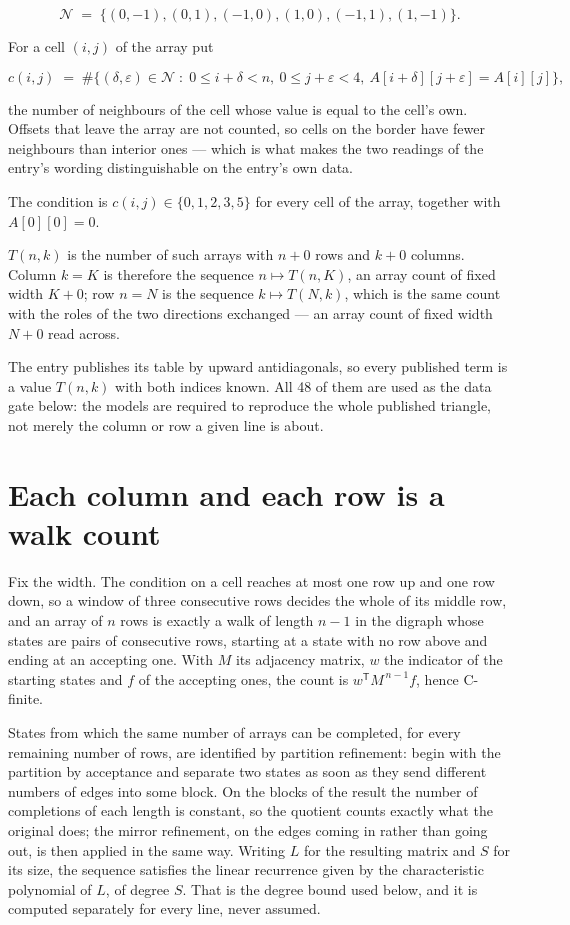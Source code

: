 \documentclass[11pt]{article}
\theoremstyle{definition}
\begin{document}
\[\mathcal{N} \;=\; \{(0,-1), (0,1), (-1,0), (1,0), (-1,1), (1,-1)\}.\]

For a cell $(i,j)$ of the array put

\[c(i,j) \;=\; \#\bigl\{(\delta,\varepsilon)\in\mathcal{N} \;:\; 0\le i+\delta<n,\ 0\le j+\varepsilon<4,\ A[i+\delta][j+\varepsilon] = A[i][j]\bigr\},\]

the number of neighbours of the cell whose value is equal to the cell's own. Offsets that leave the array are not counted, so cells on the border have fewer neighbours than interior ones --- which is what makes the two readings of the entry's wording distinguishable on the entry's own data.

The condition is $c(i,j) \in \{0, 1, 2, 3, 5\}$ for every cell of the array, together with $A[0][0]=0$.

$T(n,k)$ is the number of such arrays with $n + 0$ rows and $k + 0$ columns. Column $k = K$ is therefore the sequence $n \mapsto T(n,K)$, an array count of fixed width $K + 0$; row $n = N$ is the sequence $k \mapsto T(N,k)$, which is the same count with the roles of the two directions exchanged --- an array count of fixed width $N + 0$ read across.

The entry publishes its table by upward antidiagonals, so every published term is a value $T(n,k)$ with both indices known. All 48 of them are used as the data gate below: the models are required to reproduce the whole published triangle, not merely the column or row a given line is about.

\section{Each column and each row is a walk count}

Fix the width. The condition on a cell reaches at most one row up and one row down, so a window of three consecutive rows decides the whole of its middle row, and an array of $n$ rows is exactly a walk of length $n-1$ in the digraph whose states are pairs of consecutive rows, starting at a state with no row above and ending at an accepting one. With $M$ its adjacency matrix, $w$ the indicator of the starting states and $f$ of the accepting ones, the count is $w^{\mathsf T}M^{\,n-1}f$, hence C-finite.

States from which the same number of arrays can be completed, for every remaining number of rows, are identified by partition refinement: begin with the partition by acceptance and separate two states as soon as they send different numbers of edges into some block. On the blocks of the result the number of completions of each length is constant, so the quotient counts exactly what the original does; the mirror refinement, on the edges coming in rather than going out, is then applied in the same way. Writing $L$ for the resulting matrix and $S$ for its size, the sequence satisfies the linear recurrence given by the characteristic polynomial of $L$, of degree $S$. That is the degree bound used below, and it is computed separately for every line, never assumed.
\end{document}
